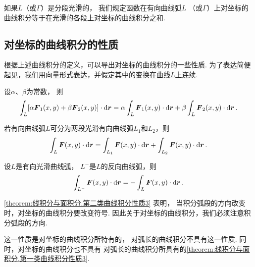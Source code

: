 如果\(L\)（或\(\Gamma\)）是分段光滑的，
我们规定函数在有向曲线弧\(L\)
（或\(\Gamma\)）上对坐标的曲线积分等于在光滑的各段上对坐标的曲线积分之和.

\subsection{对坐标的曲线积分的性质}
根据上述曲线积分的定义，可以导出对坐标的曲线积分的一些性质.
为了表达简便起见，我们用向量形式表达，并假定其中的变换在曲线\(L\)上连续.

\begin{property}\label{theorem:线积分与面积分.第二类曲线积分性质1}
设\(\alpha\)、\(\beta\)为常数，
则\[
	\int_L [\alpha \boldsymbol{F}_1(x,y) + \beta \boldsymbol{F}_2(x,y)] \cdot \dd{\boldsymbol{r}}
	= \alpha \int_L \boldsymbol{F}_1(x,y) \cdot \dd{\boldsymbol{r}}
	+ \beta \int_L \boldsymbol{F}_2(x,y) \cdot \dd{\boldsymbol{r}}.
\]
\end{property}

\begin{property}\label{theorem:线积分与面积分.第二类曲线积分性质2}
若有向曲线弧\(L\)可分为两段光滑有向曲线弧\(L_1\)和\(L_2\)，则\[
	\int_L \boldsymbol{F}(x,y) \cdot \dd{\boldsymbol{r}}
	= \int_{L_1} \boldsymbol{F}(x,y) \cdot \dd{\boldsymbol{r}}
	+ \int_{L_2} \boldsymbol{F}(x,y) \cdot \dd{\boldsymbol{r}}.
\]
\end{property}

\begin{property}\label{theorem:线积分与面积分.第二类曲线积分性质3}
设\(L\)是有向光滑曲线弧，
\(L^-\)是\(L\)的反向曲线弧，则\[
	\int_{L^-} \boldsymbol{F}(x,y) \cdot \dd{\boldsymbol{r}}
	= - \int_L \boldsymbol{F}(x,y) \cdot \dd{\boldsymbol{r}}.
\]
\end{property}
\cref{theorem:线积分与面积分.第二类曲线积分性质3} 表明，
当积分弧段的方向改变时，对坐标的曲线积分要改变符号.
因此关于对坐标的曲线积分，我们必须注意积分弧段的方向.

这一性质是对坐标的曲线积分所特有的，
对弧长的曲线积分不具有这一性质.
同时，对坐标的曲线积分也不具有
对弧长的曲线积分所具有的\cref{theorem:线积分与面积分.第一类曲线积分性质3}.

